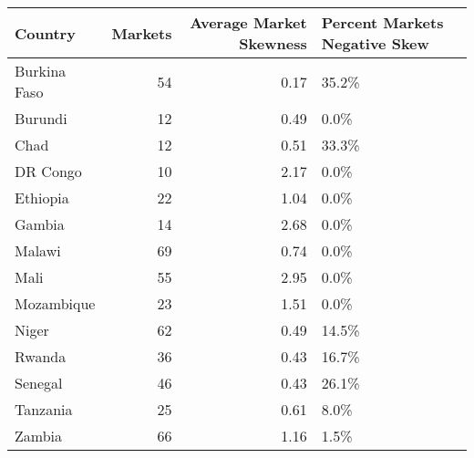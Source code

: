 \begin{table}[ht]
\centering
\begin{tabular}{lrrl}
  \hline
Country & Markets & Average Market Skewness  & Percent Markets Negative Skew \\ 
  \hline
Burkina Faso &  54 & 0.17 & 35.2\% \\ 
  Burundi &  12 & 0.49 & 0.0\% \\ 
  Chad &  12 & 0.51 & 33.3\% \\ 
  DR Congo &  10 & 2.17 & 0.0\% \\ 
  Ethiopia &  22 & 1.04 & 0.0\% \\ 
  Gambia &  14 & 2.68 & 0.0\% \\ 
  Malawi &  69 & 0.74 & 0.0\% \\ 
  Mali &  55 & 2.95 & 0.0\% \\ 
  Mozambique &  23 & 1.51 & 0.0\% \\ 
  Niger &  62 & 0.49 & 14.5\% \\ 
  Rwanda &  36 & 0.43 & 16.7\% \\ 
  Senegal &  46 & 0.43 & 26.1\% \\ 
  Tanzania &  25 & 0.61 & 8.0\% \\ 
  Zambia &  66 & 1.16 & 1.5\% \\ 
   \hline
\end{tabular}
\end{table}

